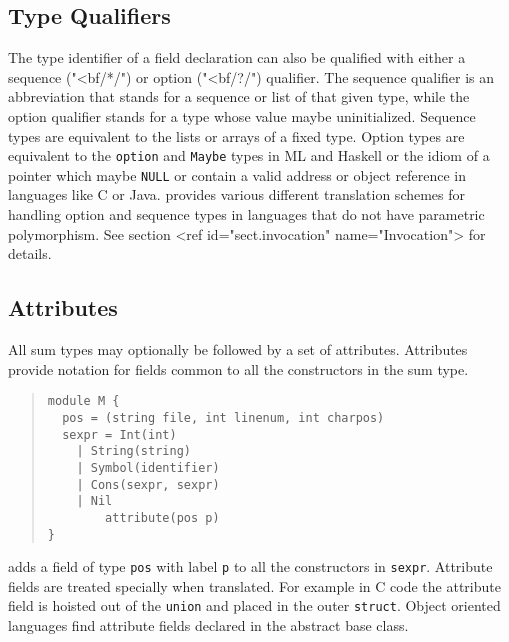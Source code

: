 \subsection{Type Qualifiers}

The type identifier of a field declaration can also be qualified with either
a sequence ("<bf/*/") or option ("<bf/?/") qualifier. The sequence qualifier
is an abbreviation that stands for a sequence or list of that given type,
while the option qualifier stands for a type whose value maybe
uninitialized. Sequence types are equivalent to the lists or arrays of a
fixed type. Option types are equivalent to the \lstinline[language=ASDL]!option! and \lstinline[language=ASDL]!Maybe!
types in ML and Haskell or the idiom of a pointer which maybe \lstinline[language=ASDL]!NULL! or
contain a valid address or object reference in languages like C or Java.
\asdlgen{} provides various different translation schemes for handling option
and sequence types in languages that do not have parametric polymorphism. 
See section <ref id="sect.invocation" name="Invocation"> for details.

\subsection{Attributes}
All sum types may optionally be followed by a set of
attributes. Attributes provide notation for fields common to all the
constructors in the sum type. 
\begin{quote}\begin{lstlisting}[language=ASDL]
module M {
  pos = (string file, int linenum, int charpos)
  sexpr = Int(int)
	| String(string)
	| Symbol(identifier)
	| Cons(sexpr, sexpr)
	| Nil
        attribute(pos p)
}
\end{lstlisting}\end{quote}%
adds a field of type \lstinline[language=ASDL]!pos! with label \lstinline[language=ASDL]!p! to all the constructors in
\lstinline[language=ASDL]!sexpr!. Attribute fields are treated specially when
translated. For example in C code the attribute field is hoisted out of the
\lstinline[language=ASDL]!union! and placed in the outer \lstinline[language=ASDL]!struct!. Object oriented languages
find attribute fields declared in the abstract base class. 

